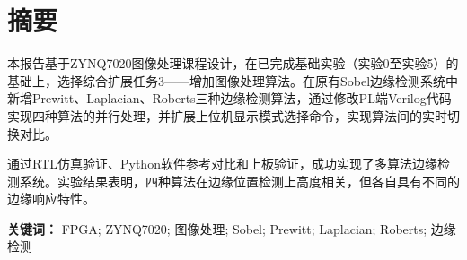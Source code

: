 
\section{摘要}

本报告基于ZYNQ7020图像处理课程设计，在已完成基础实验（实验0至实验5）的基础上，选择综合扩展任务3——增加图像处理算法。在原有Sobel边缘检测系统中新增Prewitt、Laplacian、Roberts三种边缘检测算法，通过修改PL端Verilog代码实现四种算法的并行处理，并扩展上位机显示模式选择命令，实现算法间的实时切换对比。

通过RTL仿真验证、Python软件参考对比和上板验证，成功实现了多算法边缘检测系统。实验结果表明，四种算法在边缘位置检测上高度相关，但各自具有不同的边缘响应特性。

\par
\textbf{关键词：} FPGA; ZYNQ7020; 图像处理; Sobel; Prewitt; Laplacian; Roberts; 边缘检测
